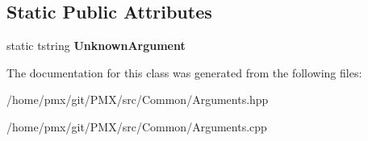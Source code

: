 \subsection*{Static Public Attributes}
\begin{DoxyCompactItemize}
\item 
\mbox{\label{classArguments_ae05c050ed337371073540239a4d43bd3}} 
static tstring {\bfseries Unknown\+Argument}
\end{DoxyCompactItemize}


The documentation for this class was generated from the following files\+:\begin{DoxyCompactItemize}
\item 
/home/pmx/git/\+P\+M\+X/src/\+Common/Arguments.\+hpp\item 
/home/pmx/git/\+P\+M\+X/src/\+Common/Arguments.\+cpp\end{DoxyCompactItemize}
